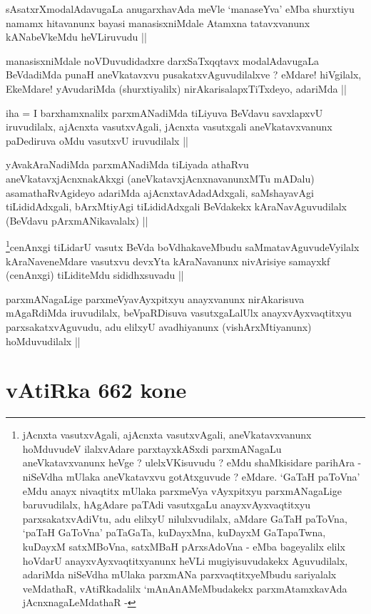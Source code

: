 \begin{artha}
sAsatxrXmodalAdavugaLa anugarxhavAda meVle `manaseYva' eMba shurxtiyu
namamx hitavanunx bayasi manasisxniMdale Atamxna tatavxvanunx
kANabeVkeMdu heVLiruvudu ||
\end{artha}


\begin{artha}
manasisxniMdale noVDuvudidadxre darxSaTxqqtavx modalAdavugaLa
BeVdadiMda punaH aneVkatavxvu pusakatxvAguvudilalxve ? eMdare!
hiVgilalx, EkeMdare! yAvudariMda (shurxtiyalilx)
nirAkarisalapxTiTxdeyo, adariMda ||
\end{artha}


\begin{artha}
iha = I barxhamxnalilx parxmANadiMda tiLiyuva BeVdavu savxlapxvU
iruvudilalx, ajAcnxta vasutxvAgali, jAcnxta vasutxgali
aneVkatavxvanunx paDediruva oMdu vasutxvU iruvudilalx ||
\end{artha}


\begin{artha}
yAvakAraNadiMda parxmANadiMda tiLiyada athaRvu aneVkatavxjAcnxnakAkxgi
(aneVkatavxjAcnxnavanunxMTu mADalu) asamathaRvAgideyo adariMda
ajAcnxtavAdadAdxgali, saMshayavAgi tiLididAdxgali, bArxMtiyAgi
tiLididAdxgali BeVdakekx kAraNavAguvudilalx (BeVdavu pArxmANikavalalx) ||
\end{artha}


\begin{artha}
\footnote{jAcnxta vasutxvAgali, ajAcnxta vasutxvAgali,
  aneVkatavxvanunx hoMduvudeV ilalxvAdare parxtayxkASxdi parxmANagaLu
  aneVkatavxvanunx heVge ? ulelxVKisuvudu ? eMdu shaMkisidare parihAra
  - niSeVdha mUlaka aneVkatavxvu gotAtxguvude ? eMdare. `GaTaH
  paToVna' eMdu anayx nivaqtitx mUlaka parxmeVya vAyxpitxyu
  parxmANagaLige baruvudilalx, hAgAdare paTAdi vasutxgaLu
  anayxvAyxvaqtitxyu parxsakatxvAdiVtu, adu elilxyU nilulxvudilalx,
  aMdare GaTaH paToVna, `paTaH GaToVna' paTaGaTa, kuDayxMna, kuDayxM
  GaTapaTwna, kuDayxM satxMBoVna, satxMBaH pArxsAdoVna - eMba
  bageyalilx elilx hoVdarU anayxvAyxvaqtitxyanunx heVLi
  mugiyisuvudakekx Aguvudilalx, adariMda niSeVdha mUlaka parxmANa
  parxvaqtitxyeMbudu sariyalalx veMdathaR, vAtiRkadalilx
  `mAnAnAMeMbudakekx parxmAtamxkavAda jAcnxnagaLeMdathaR -}cenAnxgi tiLidarU vasutx BeVda boVdhakaveMbudu saMmatavAguvudeVyilalx
kAraNaveneMdare vasutxvu devxYta kAraNavanunx nivArisiye samayxkf
(cenAnxgi) tiLiditeMdu sididhxsuvadu ||
\end{artha}

\begin{artha}
parxmANagaLige parxmeVyavAyxpitxyu anayxvanunx nirAkarisuva mAgaRdiMda
iruvudilalx, beVpaRDisuva vasutxgaLalUlx anayxvAyxvaqtitxyu
parxsakatxvAguvudu, adu elilxyU avadhiyanunx (vishArxMtiyanunx)
hoMduvudilalx ||
\end{artha}

\section*{vAtiRka 662 kone}
